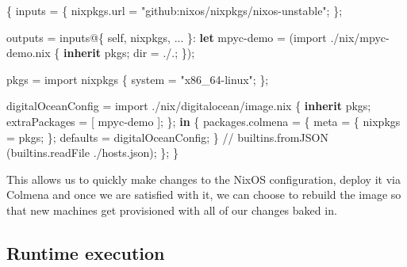 \documentclass[
]{article}
\newenvironment{Shaded}{}{}
\newcommand{\BuiltInTok}[1]{\textcolor[rgb]{0.00,0.50,0.00}{#1}}
\newcommand{\KeywordTok}[1]{\textcolor[rgb]{0.00,0.44,0.13}{\textbf{#1}}}
\newcommand{\NormalTok}[1]{#1}
\newcommand{\OperatorTok}[1]{\textcolor[rgb]{0.40,0.40,0.40}{#1}}
\newcommand{\SpecialStringTok}[1]{\textcolor[rgb]{0.73,0.40,0.53}{#1}}
\newcommand{\StringTok}[1]{\textcolor[rgb]{0.25,0.44,0.63}{#1}}
\newcommand{\VariableTok}[1]{\textcolor[rgb]{0.10,0.09,0.49}{#1}}
\begin{document}
\begin{Shaded}
  \begin{Highlighting}[]
    \OperatorTok{\{}
    \VariableTok{inputs} \OperatorTok{=} \OperatorTok{\{}
    \VariableTok{nixpkgs}\NormalTok{.}\VariableTok{url} \OperatorTok{=} \StringTok{"github:nixos/nixpkgs/nixos{-}unstable"}\OperatorTok{;}
    \OperatorTok{\};}

    \VariableTok{outputs} \OperatorTok{=}\NormalTok{ inputs@}\OperatorTok{\{} \VariableTok{self}\OperatorTok{,} \VariableTok{nixpkgs}\OperatorTok{,} \OperatorTok{...} \OperatorTok{\}}\NormalTok{:}
    \KeywordTok{let}
    \VariableTok{mpyc{-}demo} \OperatorTok{=} \OperatorTok{(}\BuiltInTok{import} \SpecialStringTok{./nix/mpyc{-}demo.nix} \OperatorTok{\{} \KeywordTok{inherit}\NormalTok{ pkgs}\OperatorTok{;} \VariableTok{dir} \OperatorTok{=} \SpecialStringTok{./.}\OperatorTok{;} \OperatorTok{\});}

    \VariableTok{pkgs} \OperatorTok{=} \BuiltInTok{import}\NormalTok{ nixpkgs }\OperatorTok{\{}
    \VariableTok{system} \OperatorTok{=} \StringTok{"x86\_64{-}linux"}\OperatorTok{;}
    \OperatorTok{\};}

    \VariableTok{digitalOceanConfig} \OperatorTok{=} \BuiltInTok{import} \SpecialStringTok{./nix/digitalocean/image.nix} \OperatorTok{\{}
    \KeywordTok{inherit}\NormalTok{ pkgs}\OperatorTok{;}
    \VariableTok{extraPackages} \OperatorTok{=} \OperatorTok{[}\NormalTok{ mpyc{-}demo }\OperatorTok{];}
    \OperatorTok{\};}
    \KeywordTok{in}
    \OperatorTok{\{}
    \VariableTok{packages}\NormalTok{.}\VariableTok{colmena} \OperatorTok{=} \OperatorTok{\{}
    \VariableTok{meta} \OperatorTok{=} \OperatorTok{\{}
    \VariableTok{nixpkgs} \OperatorTok{=}\NormalTok{ pkgs}\OperatorTok{;}
    \OperatorTok{\};}
    \VariableTok{defaults} \OperatorTok{=}\NormalTok{ digitalOceanConfig}\OperatorTok{;}
    \OperatorTok{\}} \OperatorTok{//} \BuiltInTok{builtins}\NormalTok{.fromJSON }\OperatorTok{(}\BuiltInTok{builtins}\NormalTok{.readFile }\SpecialStringTok{./hosts.json}\OperatorTok{);}
    \OperatorTok{\};}
    \OperatorTok{\}}
  \end{Highlighting}
\end{Shaded}

This allows us to quickly make changes to the NixOS configuration,
deploy it via Colmena and once we are satisfied with it, we can choose
to rebuild the image so that new machines get provisioned with all of
our changes baked in.

\hypertarget{runtime-execution}{%
  \subsection{Runtime execution}\label{runtime-execution}}
\end{document}
